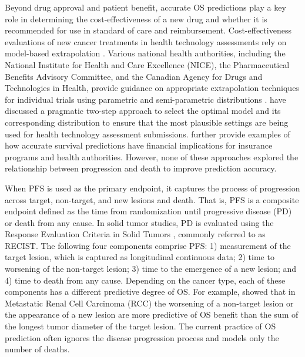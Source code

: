 \documentclass[aoas]{imsart}
\theoremstyle{plain}
\theoremstyle{remark}
\begin{document}
Beyond drug approval and patient benefit, accurate OS predictions play a key role in determining the cost-effectiveness of a new drug and whether it is recommended for use in standard of care and reimbursement. Cost-effectiveness evaluations of new cancer treatments in health technology assessments rely on model-based extrapolation \citep{dias2011nice, latimer2011nice}. Various national health authorities, including the National Institute for Health and Care Excellence (NICE), the Pharmaceutical Benefits Advisory Committee, and the Canadian Agency for Drugs and Technologies in Health, provide guidance on appropriate extrapolation techniques for individual trials using parametric and semi-parametric distributions \citep{canadian2006guidelines, latimer2011nice, pharmaceutical2016guidelines}. \cite{heeg2022novel} have discussed a pragmatic two-step approach to select the optimal model and its corresponding distribution to ensure that the most plausible settings are being used for health technology assessment submissions. \cite{henderson2001accuracy} further provide examples of how accurate survival predictions have financial implications for insurance programs and health authorities. However, none of these approaches explored the relationship between progression and death to improve prediction accuracy.

When PFS is used as the primary endpoint, it captures the process of progression across target, non-target, and new lesions and death. That is, PFS is a composite endpoint defined as the time from randomization until progressive disease (PD) or death from any cause. In solid tumor studies, PD is evaluated using the Response Evaluation Criteria in Solid Tumors \citep{eisenhauer2009new}, commonly referred to as RECIST. The following four components comprise PFS: 1) measurement of the target lesion, which is captured as longitudinal continuous data; 2) time to worsening of the non-target lesion; 3) time to the emergence of a new lesion; and 4) time to death from any cause. Depending on the cancer type, each of these components has a different predictive degree of OS. For example, \cite{stein2013survival} showed that in Metastatic Renal Cell Carcinoma (RCC) the worsening of a non-target lesion or the appearance of a new lesion are more predictive of OS benefit than the sum of the longest tumor diameter of the target lesion. The current practice of OS prediction often ignores the disease progression process and models only the number of deaths.
\end{document}
